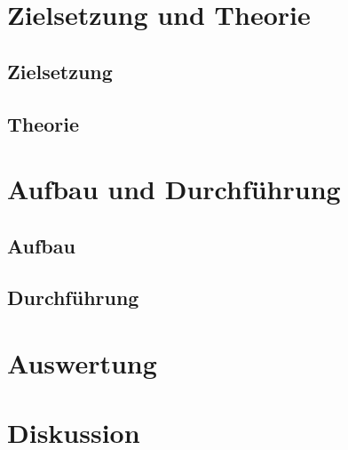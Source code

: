 





\maketitle
\tableofcontents
\newpage

\section{Zielsetzung und Theorie}

\subsection{Zielsetzung}


\subsection{Theorie}


\section{Aufbau und Durchführung}

\subsection{Aufbau}


\subsection{Durchführung}


% 

\section{Auswertung}


\section{Diskussion}


\newpage


